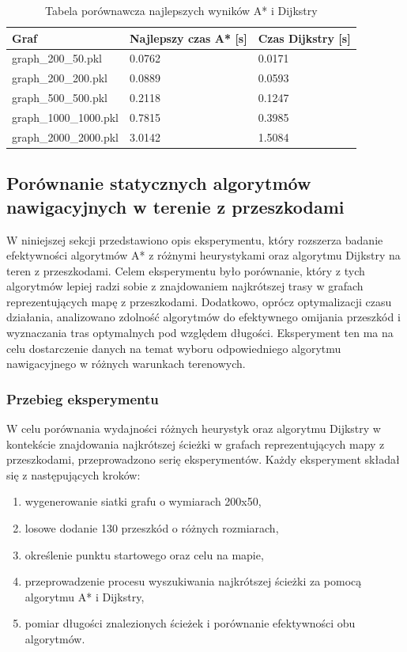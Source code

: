 \documentclass[12pt,twoside]{article}
\begin{document}
\begin{table}[ht]
\caption{Tabela porównawcza najlepszych wyników A* i Dijkstry}
\centering		
\begin{tabular}{|p{}|p{}|p{}|}	
\hline
Graf & Najlepszy czas A* [s] & Czas Dijkstry [s] \\
\hline
graph\_200\_50.pkl & 
0.0762 & 
0.0171 \\
graph\_200\_200.pkl & 
0.0889 & 
0.0593 \\
graph\_500\_500.pkl & 
0.2118 & 
0.1247 \\
graph\_1000\_1000.pkl & 
0.7815 & 
0.3985 \\
graph\_2000\_2000.pkl & 
3.0142 & 
1.5084 \\
\hline
\end{tabular}	

\label{Tab:comparison}
\end{table}

\clearpage

\subsection{Porównanie statycznych algorytmów nawigacyjnych w terenie z przeszkodami}

W niniejszej sekcji przedstawiono opis eksperymentu, który rozszerza badanie efektywności algorytmów A* z różnymi heurystykami oraz algorytmu Dijkstry na teren z przeszkodami. Celem eksperymentu było porównanie, który z tych algorytmów lepiej radzi sobie z znajdowaniem najkrótszej trasy w grafach reprezentujących mapę z przeszkodami. Dodatkowo, oprócz optymalizacji czasu działania, analizowano zdolność algorytmów do efektywnego omijania przeszkód i wyznaczania tras optymalnych pod względem długości. Eksperyment ten ma na celu dostarczenie danych na temat wyboru odpowiedniego algorytmu nawigacyjnego w różnych warunkach terenowych.

\subsubsection{Przebieg eksperymentu}

W celu porównania wydajności różnych heurystyk oraz algorytmu Dijkstry w kontekście znajdowania najkrótszej ścieżki w grafach reprezentujących mapy z przeszkodami, przeprowadzono serię eksperymentów. Każdy eksperyment składał się z następujących kroków:

\begin{enumerate}[label=\alph*), leftmargin=1.25cm]
    \item wygenerowanie siatki grafu o wymiarach 200x50,
    \item losowe dodanie 130 przeszkód o różnych rozmiarach,
    \item określenie punktu startowego oraz celu na mapie,
    \item przeprowadzenie procesu wyszukiwania najkrótszej ścieżki za pomocą algorytmu A* i Dijkstry,
    \item pomiar długości znalezionych ścieżek i porównanie efektywności obu algorytmów.
\end{enumerate}
\end{document}
